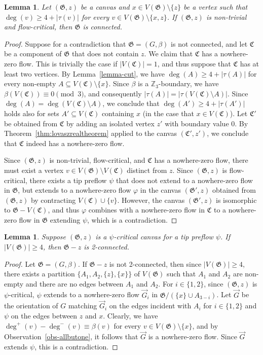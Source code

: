 \documentclass{article}
\newcommand{\Z}{\mathbb{Z}_3}
\newcommand\g{\mathfrak{G}}
\newcommand\comp{\mathfrak{C}}
\newtheorem{lemma}[theorem]{Lemma}
\begin{document}
\begin{lemma}\label{lemma-conn}
Let $(\g,z)$ be a canvas and $x\in V(\g)\setminus \{z\}$ be a vertex such that $\deg(v)\ge 4+|\tau(v)|$ for every $v\in V(\g)\setminus\{x,z\}$.
If $(\g,z)$ is non-trivial and flow-critical, then $\g$ is connected.
\end{lemma}
\begin{proof}
Suppose for a contradiction that $\g=(G,\beta)$ is not connected, and let $\comp$ be a component of $\g$ that does not contain $z$.
We claim that $\comp$ has a nowhere-zero flow.  This is trivially the case if $|V(\comp)|=1$, and thus suppose that $\comp$ has at least two vertices.
By Lemma~\ref{lemma-cut}, we have $\deg(A)\ge 4+|\tau(A)|$ for every non-empty $A\subseteq V(\comp)\setminus \{x\}$.
Since $\beta$ is a $\Z$-boundary, we have $\beta(V(\comp))\equiv 0\pmod 3$, and consequently $|\tau(A)|=|\tau(V(\comp)\setminus A)|$.
Since $\deg(A) =\deg(V(\comp)\setminus A)$, we conclude that $\deg(A')\ge 4+|\tau(A')|$ holds also for sets $A'\subseteq V(\comp)$ containing $x$
(in the case that $x\in V(\comp)$).  Let $\comp'$ be obtained from $\comp$ by adding an isolated vertex $z'$ with boundary value $0$.
By Theorem~\ref{thm:lovaszrealtheorem} applied to the canvas $(\comp',z')$, we conclude that $\comp$ indeed has a nowhere-zero flow.

Since $(\g,z)$ is non-trivial, flow-critical, and $\comp$ has a nowhere-zero flow, there must exist a vertex $v\in V(\g)\setminus V(\comp)$ distinct from $z$.
Since $(\g,z)$ is flow-critical, there exists a tip preflow $\psi$ that does not extend to a nowhere-zero flow in $\g$, but extends to a nowhere-zero flow $\varphi$ in the canvas $(\g',z)$ obtained from $(\g,z)$
by contracting $V(\comp)\cup\{v\}$.  However, the canvas $(\g',z)$ is isomorphic to $\g-V(\comp)$, and thus
$\varphi$ combines with a nowhere-zero flow in $\comp$ to a nowhere-zero flow in $\g$ extending $\psi$, which is a contradiction.
\end{proof}

\begin{lemma}\label{lemma-2con}
Suppose $(\g,z)$ is a $\psi$-critical canvas for a tip preflow $\psi$.  If $|V(\g)|\ge 4$, then $\g-z$ is 2-connected.
\end{lemma}
\begin{proof}
Let $\g=(G,\beta)$. If $\g-z$ is not 2-connected, then since $|V(\g)|\ge 4$, there exists a partition $\{A_1,A_2,\{z\},\{x\}\}$ of $V(\g)$ such that
$A_1$ and $A_2$ are non-empty and there are no edges between $A_1$ and $A_2$.  For $i\in\{1,2\}$, since $(\g,z)$ is $\psi$-critical,
$\psi$ extends to a nowhere-zero flow $\vec{G}_i$ in $\g/(\{x\}\cup A_{3-i})$.  Let $\vec{G}$ be the orientation of $G$ matching $\vec{G}_i$ on the
edges incident with $A_i$ for $i\in\{1,2\}$ and $\psi$ on the edges between $z$ and $x$.   Clearly, we have $\deg^+(v)-\deg^-(v)\equiv \beta(v)$ for every $v\in V(\g)\setminus\{x\}$,
 and by Observation~\ref{obs-allbutone}, it follows that $\vec{G}$ is a nowhere-zero flow.  Since $\vec{G}$ extends $\psi$, this is a contradiction. 
\end{proof}
\end{document}
